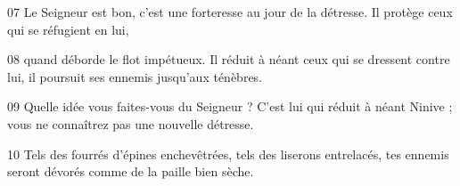 
07 Le Seigneur est bon, c’est une forteresse au jour de la détresse. Il protège ceux qui se réfugient en lui,

08 quand déborde le flot impétueux. Il réduit à néant ceux qui se dressent contre lui, il poursuit ses ennemis jusqu’aux ténèbres.

09 Quelle idée vous faites-vous du Seigneur ? C’est lui qui réduit à néant Ninive ; vous ne connaîtrez pas une nouvelle détresse.

10 Tels des fourrés d’épines enchevêtrées, tels des liserons entrelacés, tes ennemis seront dévorés comme de la paille bien sèche.